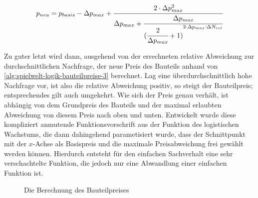 \begin{equation}
     p_{neu} = p_{basis} -\Delta{}p_{max} + \cfrac{2 \cdot \Delta{}p_{max}^2}{\Delta{}p_{max} + \cfrac{\Delta{}p_{max}}{({\cfrac{2}{\Delta{}p_{max}} + 1)}^{2 \cdot \Delta{}p_{max} \cdot \Delta{}N_{rel}}}}
     \label{alg:spielwelt-logik-bauteilpreise-3}
\end{equation}

Zu guter letzt wird dann, ausgehend von der errechneten relative Abweichung zur durchschnittlichen
Nachfrage, der neue Preis des Bauteils anhand von \ref{alg:spielwelt-logik-bauteilpreise-3}
berechnet. Lag eine überdurchschnittlich hohe Nachfrage vor, ist also die relative Abweichung
positiv, so steigt der Bauteilpreis; entsprechendes gilt auch umgekehrt. Wie sich der Preis genau
verhält, ist abhängig von dem Grundpreis des Bauteils und der maximal erlaubten Abweichung von
diesem Preis nach oben und unten. Entwickelt wurde diese kompliziert anmutende Funktionsvorschrift
aus der Funktion des logistischen Wachstums, die dann dahingehend parametisiert wurde, dass der
Schnittpunkt mit der $x$-Achse als Basispreis und die maximale Preisabweichung frei gewählt werden
können. Hierdurch entsteht für den einfachen Sachverhalt eine sehr verschachtelte Funktion, die
jedoch nur eine Abwandlung einer einfachen Funktion ist.


\newcommand{\pbasis}{3.5}
\newcommand{\pdelta}{2.5}
\begin{figure}[ht]
     \centering
% 
% 
% 
% 
     \caption{Die Berechnung des Bauteilpreises}
     \label{img:spielwelt-logik-bauteilpreise-graph}
\end{figure}

